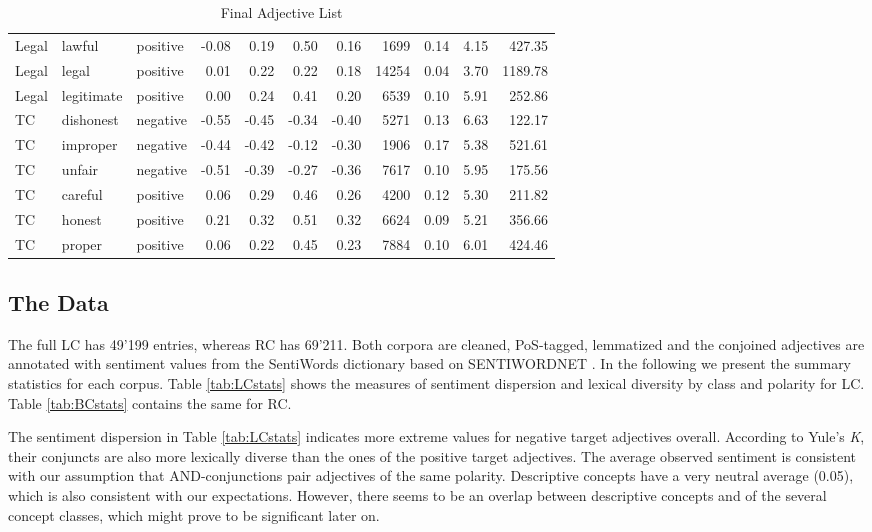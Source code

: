 \documentclass{article}
\begin{document}
\begin{table}[!h]
{\begin{minipage}{\textwidth}
\begin{tabular}{lllrrrrrrrr}
  Legal & lawful & positive & -0.08 & 0.19 & 0.50 & 0.16 & 1699 & 0.14 & 4.15 & 427.35 \\ 
  Legal & legal & positive & 0.01 & 0.22 & 0.22 & 0.18 & 14254 & 0.04 & 3.70 & 1189.78 \\ 
  Legal & legitimate & positive & 0.00 & 0.24 & 0.41 & 0.20 & 6539 & 0.10 & 5.91 & 252.86 \\ 
  TC & dishonest & negative & -0.55 & -0.45 & -0.34 & -0.40 & 5271 & 0.13 & 6.63 & 122.17 \\ 
  TC & improper & negative & -0.44 & -0.42 & -0.12 & -0.30 & 1906 & 0.17 & 5.38 & 521.61 \\ 
  TC & unfair & negative & -0.51 & -0.39 & -0.27 & -0.36 & 7617 & 0.10 & 5.95 & 175.56 \\ 
  TC & careful & positive & 0.06 & 0.29 & 0.46 & 0.26 & 4200 & 0.12 & 5.30 & 211.82 \\ 
  TC & honest & positive & 0.21 & 0.32 & 0.51 & 0.32 & 6624 & 0.09 & 5.21 & 356.66 \\ 
  TC & proper & positive & 0.06 & 0.22 & 0.45 & 0.23 & 7884 & 0.10 & 6.01 & 424.46 \\ 
   \hline
\end{tabular}
\end{minipage}
}
\caption{Final Adjective List}
\label{tab:ADJlist}
\end{table}


\subsection{The Data}


The full LC has 49'199 entries, whereas RC has 69'211. Both corpora are cleaned, PoS-tagged, lemmatized and the conjoined adjectives are annotated with sentiment values from the SentiWords dictionary based on SENTIWORDNET \citep{Esuli2006, Baccianella2010, Guerini2013, Gatti2016}. In the following we present the summary statistics for each corpus. Table \ref{tab:LCstats} shows the measures of sentiment dispersion and lexical diversity by class and polarity for LC. Table \ref{tab:BCstats} contains the same for RC. 

The sentiment dispersion in Table \ref{tab:LCstats} indicates more extreme values for negative target adjectives overall. According to Yule's \textit{K}, their conjuncts are also more lexically diverse than the ones of the positive target adjectives. The average observed sentiment is consistent with our assumption that AND-conjunctions pair adjectives of the same polarity. Descriptive concepts have a very neutral average (0.05), which is also consistent with our expectations. However, there seems to be an overlap between descriptive concepts and of the several concept classes, which might prove to be significant later on.
\end{document}
